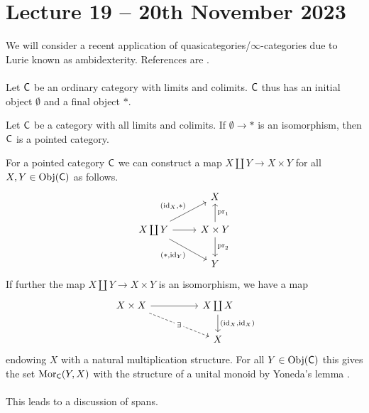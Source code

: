 \section{Lecture 19 -- 20th November 2023}
We will consider a recent application of quasicategories/$\infty$-categories due to Lurie known as ambidexterity. References are \cite{HarpazAmbi,LuriHopkinsAmbi}. 
\\\\
Let $\mathsf{C}$ be an ordinary category with limits and colimits. $\mathsf{C}$ thus has an initial object $\emptyset$ and a final object $*$. 
\begin{definition}
    Let $\mathsf{C}$ be a category with all limits and colimits. If $\emptyset\to*$ is an isomorphism, then $\mathsf{C}$ is a pointed category. 
\end{definition}
For a pointed category $\mathsf{C}$ we can construct a map $X\coprod Y\to X\times Y$ for all $X,Y\in\mathrm{Obj}(\mathsf{C})$ as follows. 
$$%
\begin{tikzcd}
	 & X \\
	{X\coprod Y} & {X\times Y} \\
	& Y 
	\arrow[from=2-1, to=2-2]
	\arrow["{(*,\id_{Y})}"', from=2-1, to=3-2]
	\arrow["{(\id_{X},*)}", from=2-1, to=1-2]
	\arrow["{\pr_{2}}", from=2-2, to=3-2]
	\arrow["{\pr_{1}}"', from=2-2, to=1-2]
\end{tikzcd}$$
If further the map $X\coprod Y\to X\times Y$ is an isomorphism, we have a map 
$$%
\begin{tikzcd}
	{X\times X} && {X\coprod X} \\
	&& X
	\arrow[from=1-1, to=1-3]
	\arrow["{(\id_{X},\id_{X})}", from=1-3, to=2-3]
	\arrow["\exists"{description}, dashed, from=1-1, to=2-3]
\end{tikzcd}$$
endowing $X$ with a natural multiplication structure. For all $Y\in\mathrm{Obj}(\mathsf{C})$ this gives the set $\mathrm{Mor}_{\mathsf{C}}(Y,X)$ with the structure of a unital monoid by Yoneda's lemma . 
\\\\
This leads to a discussion of spans. 
